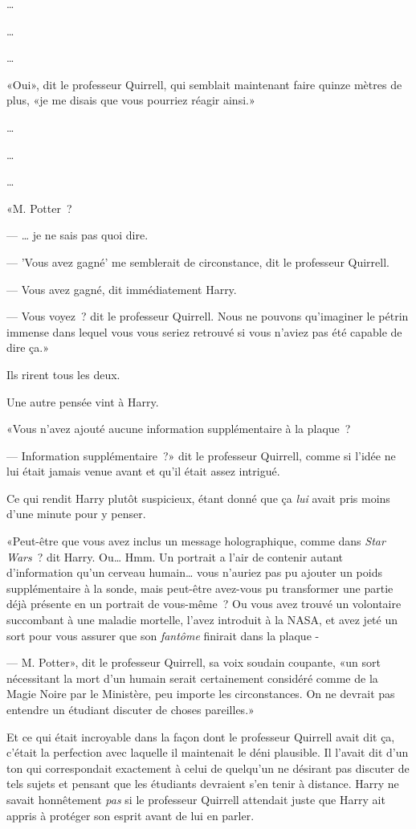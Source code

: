 …

…

…

«Oui», dit le professeur Quirrell, qui semblait maintenant faire quinze mètres de plus, «je me disais que vous pourriez réagir ainsi.»

…

…

…

«M. Potter~?

--- … je ne sais pas quoi dire.

--- 'Vous avez gagné' me semblerait de circonstance, dit le professeur Quirrell.

--- Vous avez gagné, dit immédiatement Harry.

--- Vous voyez~? dit le professeur Quirrell. Nous ne pouvons qu'imaginer le pétrin immense dans lequel vous vous seriez retrouvé si vous n'aviez pas été capable de dire ça.»

Ils rirent tous les deux.

Une autre pensée vint à Harry.

«Vous n'avez ajouté aucune information supplémentaire à la plaque~?

--- Information supplémentaire~?» dit le professeur Quirrell, comme si l'idée ne lui était jamais venue avant et qu'il était assez intrigué.

Ce qui rendit Harry plutôt suspicieux, étant donné que ça \emph{lui} avait pris moins d'une minute pour y penser.

«Peut-être que vous avez inclus un message holographique, comme dans \emph{Star Wars}~? dit Harry. Ou… Hmm. Un portrait a l'air de contenir autant d'information qu'un cerveau humain… vous n'auriez pas pu ajouter un poids supplémentaire à la sonde, mais peut-être avez-vous pu transformer une partie déjà présente en un portrait de vous-même~? Ou vous avez trouvé un volontaire succombant à une maladie mortelle, l'avez introduit à la NASA, et avez jeté un sort pour vous assurer que son \emph{fantôme} finirait dans la plaque -

--- M. Potter», dit le professeur Quirrell, sa voix soudain coupante, «un sort nécessitant la mort d'un humain serait certainement considéré comme de la Magie Noire par le Ministère, peu importe les circonstances. On ne devrait pas entendre un étudiant discuter de choses pareilles.»

Et ce qui était incroyable dans la façon dont le professeur Quirrell avait dit ça, c'était la perfection avec laquelle il maintenait le déni plausible. Il l'avait dit d'un ton qui correspondait exactement à celui de quelqu'un ne désirant pas discuter de tels sujets et pensant que les étudiants devraient s'en tenir à distance. Harry ne savait honnêtement \emph{pas} si le professeur Quirrell attendait juste que Harry ait appris à protéger son esprit avant de lui en parler.

